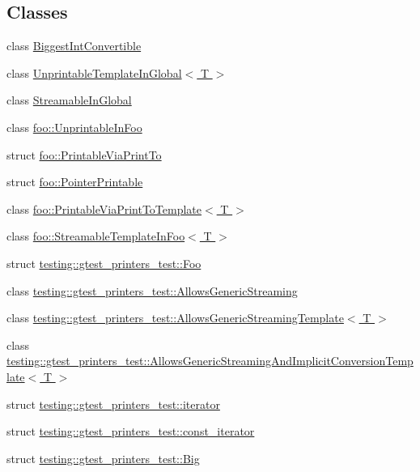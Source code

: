 \subsection*{Classes}
\begin{DoxyCompactItemize}
\item 
class \hyperlink{classBiggestIntConvertible}{Biggest\+Int\+Convertible}
\item 
class \hyperlink{classUnprintableTemplateInGlobal}{Unprintable\+Template\+In\+Global$<$ T $>$}
\item 
class \hyperlink{classStreamableInGlobal}{Streamable\+In\+Global}
\item 
class \hyperlink{classfoo_1_1UnprintableInFoo}{foo\+::\+Unprintable\+In\+Foo}
\item 
struct \hyperlink{structfoo_1_1PrintableViaPrintTo}{foo\+::\+Printable\+Via\+Print\+To}
\item 
struct \hyperlink{structfoo_1_1PointerPrintable}{foo\+::\+Pointer\+Printable}
\item 
class \hyperlink{classfoo_1_1PrintableViaPrintToTemplate}{foo\+::\+Printable\+Via\+Print\+To\+Template$<$ T $>$}
\item 
class \hyperlink{classfoo_1_1StreamableTemplateInFoo}{foo\+::\+Streamable\+Template\+In\+Foo$<$ T $>$}
\item 
struct \hyperlink{structtesting_1_1gtest__printers__test_1_1Foo}{testing\+::gtest\+\_\+printers\+\_\+test\+::\+Foo}
\item 
class \hyperlink{classtesting_1_1gtest__printers__test_1_1AllowsGenericStreaming}{testing\+::gtest\+\_\+printers\+\_\+test\+::\+Allows\+Generic\+Streaming}
\item 
class \hyperlink{classtesting_1_1gtest__printers__test_1_1AllowsGenericStreamingTemplate}{testing\+::gtest\+\_\+printers\+\_\+test\+::\+Allows\+Generic\+Streaming\+Template$<$ T $>$}
\item 
class \hyperlink{classtesting_1_1gtest__printers__test_1_1AllowsGenericStreamingAndImplicitConversionTemplate}{testing\+::gtest\+\_\+printers\+\_\+test\+::\+Allows\+Generic\+Streaming\+And\+Implicit\+Conversion\+Template$<$ T $>$}
\item 
struct \hyperlink{structtesting_1_1gtest__printers__test_1_1iterator}{testing\+::gtest\+\_\+printers\+\_\+test\+::iterator}
\item 
struct \hyperlink{structtesting_1_1gtest__printers__test_1_1const__iterator}{testing\+::gtest\+\_\+printers\+\_\+test\+::const\+\_\+iterator}
\item 
struct \hyperlink{structtesting_1_1gtest__printers__test_1_1Big}{testing\+::gtest\+\_\+printers\+\_\+test\+::\+Big}
\end{DoxyCompactItemize}
